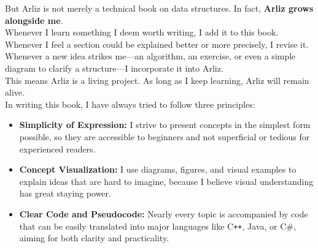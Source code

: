 \documentclass[12pt, oneside]{book}
\begin{document}
	But Arliz is not merely a technical book on data structures. In fact, \textbf{Arliz grows alongside me}. \\
	Whenever I learn something I deem worth writing, I add it to this book. Whenever I feel a section could be explained better or more precisely, I revise it. Whenever a new idea strikes me—an algorithm, an exercise, or even a simple diagram to clarify a structure—I incorporate it into Arliz.\\
	This means Arliz is a living project. As long as I keep learning, Arliz will remain alive.\\	
	In writing this book, I have always tried to follow three principles:
	
	\begin{itemize}
		\item \textbf{Simplicity of Expression:} I strive to present concepts in the simplest form possible, so they are accessible to beginners and not superficial or tedious for experienced readers.
		\item \textbf{Concept Visualization:} I use diagrams, figures, and visual examples to explain ideas that are hard to imagine, because I believe visual understanding has great staying power.
		\item \textbf{Clear Code and Pseudocode:} Nearly every topic is accompanied by code that can be easily translated into major languages like C\texttt{++}, Java, or C\#, aiming for both clarity and practicality.
	\end{itemize}
	
\end{document}
